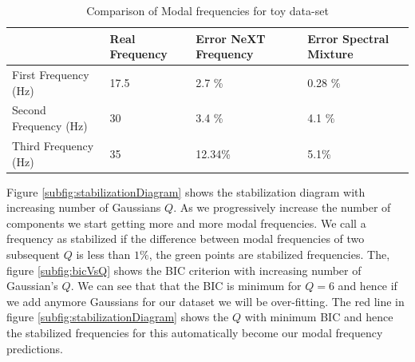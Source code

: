 \renewcommand{\arraystretch}{1}
\begin{table}[!h]
    \centering
\begin{tabular}{|l|l|l|l|}
  \hline
   & Real Frequency & Error NeXT Frequency & Error Spectral Mixture\\
  \hline 
  \hline
First Frequency (Hz) & 17.5 & 2.7 \% & 0.28 \%\\
Second Frequency (Hz)  & 30 & 3.4 \% & 4.1 \%\\
Third Frequency (Hz) & 35 & 12.34\% & 5.1\%\\
   \hline
\end{tabular}
\caption{Comparison of Modal frequencies for toy data-set}
  \label{tabComparisonOfModalFrequenciesToyData}
\end{table}

Figure \ref{subfig:stabilizationDiagram} shows the stabilization diagram with increasing number of Gaussians $Q$. As we progressively increase the number of components we start getting more and more modal frequencies. We call a frequency as stabilized if the difference between modal frequencies of two subsequent $Q$ is less than $1\%$, the green points are stabilized frequencies. The, figure \ref{subfig:bicVsQ} shows the BIC criterion with increasing number of Gaussian's $Q$. We can see that that the BIC is minimum for $Q=6$ and hence if we add anymore Gaussians for our dataset we will be over-fitting. The red line in figure \ref{subfig:stabilizationDiagram} shows the $Q$ with minimum BIC and hence the stabilized frequencies for this automatically become our modal frequency predictions.

